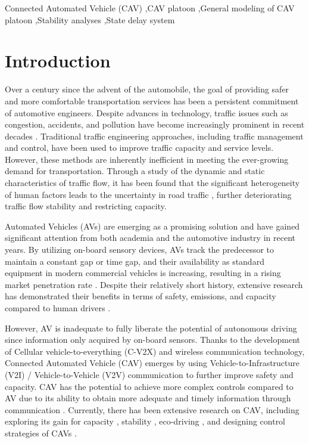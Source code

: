\documentclass[a4paper]{cas-sc}
\begin{document}
\begin{keywords}
  Connected Automated Vehicle (CAV) \sep CAV platoon \sep General modeling of CAV platoon \sep Stability analyses \sep State delay system
\end{keywords}


\maketitle

\section{Introduction}
\label{Section 1}

Over a century since the advent of the automobile, the goal of providing safer and more comfortable transportation services has been a persistent commitment of automotive engineers. Despite advances in technology, traffic issues such as congestion, accidents, and pollution have become increasingly prominent in recent decades \citep{Schrank2012,Jin2016}. Traditional traffic engineering approaches, including traffic management and control, have been used to improve traffic capacity and service levels. However, these methods are inherently inefficient in meeting the ever-growing demand for transportation. Through a study of the dynamic and static characteristics of traffic flow, it has been found that the significant heterogeneity of human factors leads to the uncertainty in road traffic \citep{Zhong2020,Ye2018,Arem2016,Yu2021}, further deteriorating traffic flow stability and restricting capacity.


Automated Vehicles (AVs) are emerging as a promising solution and have gained significant attention from both academia and the automotive industry in recent years. By utilizing on-board sensory devices, AVs track the predecessor to maintain a constant gap or time gap, and their availability as standard equipment in modern commercial vehicles is increasing, resulting in a rising market penetration rate \citep{Wilson2011}. Despite their relatively short history, extensive research has demonstrated their benefits in terms of safety, emissions, and capacity compared to human drivers \citep{Wang2019,Sarker2019,Dey2015}.


However, AV is inadequate to fully liberate the potential of autonomous driving since information only acquired by on-board sensors. Thanks to the development of Cellular vehicle-to-everything (C-V2X) and wireless communication technology, Connected Automated Vehicle (CAV) emerges by using Vehicle-to-Infrastructure (V2I) / Vehicle-to-Vehicle (V2V) communication to further improve safety and capacity. CAV has the potential to achieve more complex controls compared to AV due to its ability to obtain more adequate and timely information through communication \citep{Navas2019,Ruan2021,Zhou2021}. Currently, there has been extensive research on CAV, including exploring its gain for capacity \citep{Ghiasi2017,Chang2020}, stability \citep{Zhou2019,Montanino2021}, eco-driving \citep{Qin2018,Ruan2022}, and designing control strategies of CAVs \citep{Zhu2019,Chen2021}. 
\end{document}
